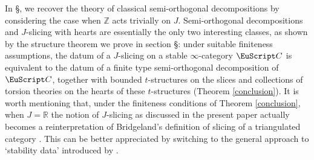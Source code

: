 In §, we recover the theory of classical semi-orthogonal decompositions by considering the case when $\mathbb{Z}$ acts trivially on $J$. Semi-orthogonal decompositions and $J$-slicing with hearts are essentially the only two interesting classes, as shown by the structure theorem we prove in section §: under suitable finiteness assumptions, the datum of a $J$-slicing on a stable $\infty$-category $\C$ is equivalent to the datum of a finite type semi-orthogonal decomposition of $\C$, together with bounded $t$-structures on the slices and collections of torsion theories  on the hearts of these $t$-structures (Theorem \ref{conclusion}). It is worth mentioning that, under the finiteness conditions of Theorem \ref{conclusion}, when $J=\mathbb{R}$ the notion of $J$-slicing as discussed in the present paper actually becomes a reinterpretation of Bridgeland's definition of slicing of a triangulated category \cite{Brid}. This can be better appreciated by switching to the general approach to `stability data' introduced by \cite{GKR}. 

